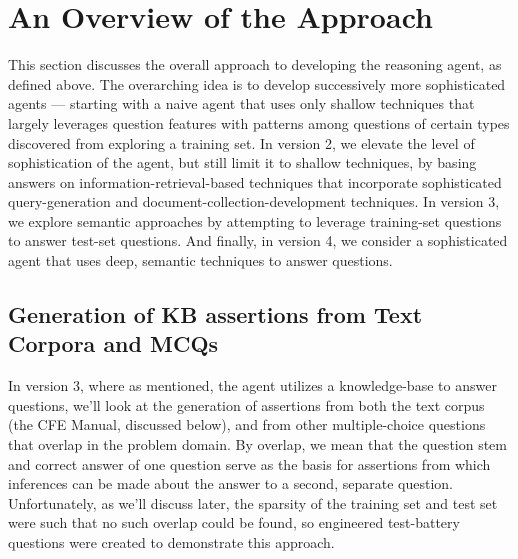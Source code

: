 %

\section{An Overview of the Approach}

This section discusses the overall approach to developing the reasoning agent, as defined above.
The overarching idea is to develop successively more sophisticated agents --- starting with a naive
agent that uses only shallow techniques that largely leverages question features with patterns 
among questions of certain types discovered from exploring a training set.  In version 2, we elevate the 
level of sophistication of the agent, but still limit it  to shallow techniques, by basing  answers on 
information-retrieval-based techniques that incorporate sophisticated query-generation and 
document-collection-development techniques.  In version 3, we explore semantic approaches by attempting
to leverage training-set questions to answer test-set questions.  And finally, in version 4, we consider
a sophisticated agent that uses deep, semantic techniques to answer questions.

\subsection{Generation of KB assertions from Text Corpora and MCQs}

In version 3, where as mentioned, the agent utilizes a knowledge-base to answer questions,
we'll look at the generation of assertions from both the text corpus (the CFE Manual, discussed below),
and from other multiple-choice questions that overlap in the problem domain.  By overlap, we mean
that the question stem and correct answer of one question serve as the basis for assertions from which inferences can be made about the answer to a second, separate question.  Unfortunately, as we'll discuss later, the sparsity of the training set and test set were such that no such overlap could be found, so
engineered test-battery questions were created to demonstrate this approach.

